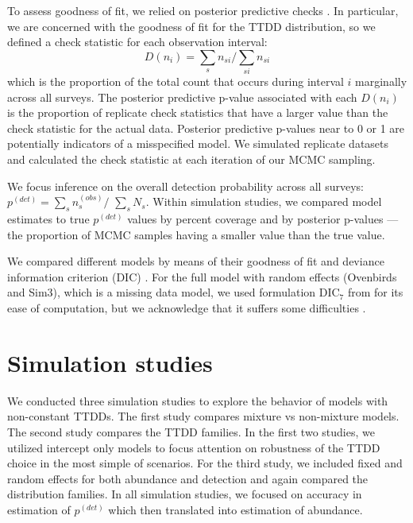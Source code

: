 \documentclass[12pt]{article}
\newcommand{\pdet}{p^{(det)}}
\newcommand{\nobs}{n^{(obs)}}
\begin{document}
To assess goodness of fit, we relied on posterior predictive checks \citep{Gelman1996}.  
In particular, we are concerned with the goodness of fit for the TTDD distribution, so we defined a check statistic for each observation interval:
\[D(n_i) = \sum\limits_{s} n_{si} \big/ \sum\limits_{si} n_{si}\]
which is the proportion of the total count that occurs during interval $i$ marginally across all surveys.  
The posterior predictive p-value associated with each $D(n_i)$ is the proportion of replicate check statistics that have a larger value than the check statistic for the actual data.  
Posterior predictive p-values near to 0 or 1 are potentially indicators of a misspecified model.
We simulated replicate datasets and calculated the check statistic at each iteration of our MCMC sampling.  

We focus inference on the overall detection probability across all surveys: $\pdet = \sum\limits_{s}\nobs_s \big/$ $\sum\limits_{s}N_{s}$.  
Within simulation studies, we compared model estimates to true $\pdet$ values by percent coverage and by posterior p-values --- the proportion of MCMC samples having a smaller value than the true value.  

We compared different models by means of their goodness of fit and deviance information criterion (DIC) \citep{Spiegelhalter2002}.  
For the full model with random effects (Ovenbirds and Sim3), which is a missing data model, we used formulation DIC$_7$ from \citet{Celeux2006} for its ease of computation, but we acknowledge that it suffers some difficulties \citep{Celeux2006, Li2014}.
\fi




\section{Simulation studies} \label{sec:sim}

We conducted three simulation studies to explore the behavior of models with non-constant TTDDs.
The first study compares mixture vs non-mixture models.
The second study compares the TTDD families.
In the first two studies, we utilized intercept only models to focus attention on robustness of the TTDD choice in the most simple of scenarios.
For the third study, we included fixed and random effects for both abundance and detection and again compared the distribution families. 
In all simulation studies, we focused on accuracy in estimation of $\pdet$ which then translated into estimation of abundance. 
\end{document}
